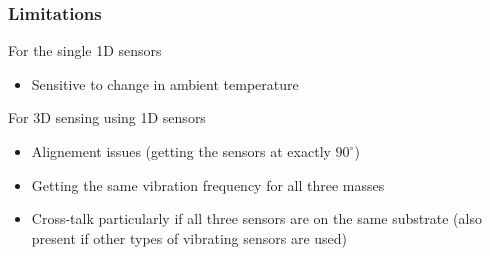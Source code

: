 \documentclass[10pt]{beamer}
\begin{document}

\begin{frame}
\frametitle{Limitations}
    For the single 1D sensors
    \begin{itemize}
        \item Sensitive to change in ambient temperature
    \end{itemize}

    For 3D sensing using 1D sensors
    \begin{itemize}
        \item Alignement issues (getting the sensors at exactly $90^{\circ}$)
        \item Getting the same vibration frequency for all three masses
        \item Cross-talk particularly if all three sensors are on the same substrate (also present if other types of vibrating sensors are used)
    \end{itemize}
\end{frame}
\end{document}
